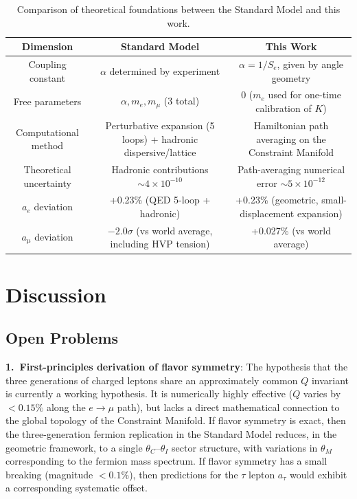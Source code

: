 \documentclass[aps,prd,reprint,nofootinbib]{revtex4-2}
\begin{document}
\begin{table}[h]
\caption{Comparison of theoretical foundations between the Standard Model and this work.}
\label{tab:comparison}
\begin{ruledtabular}
\begin{tabular}{c c c}
\hline
Dimension & Standard Model & This Work \\
\hline
Coupling constant & $\alpha$ determined by experiment & $\alpha = 1/S_e$, given by angle geometry \\
Free parameters & $\alpha, m_e, m_\mu$ (3 total) & 0 ($m_e$ used for one-time calibration of $K$) \\
Computational method & Perturbative expansion (5 loops) + hadronic dispersive/lattice & Hamiltonian path averaging on the Constraint Manifold \\
Theoretical uncertainty & Hadronic contributions $\sim 4 \times 10^{-10}$ & Path-averaging numerical error $\sim 5 \times 10^{-12}$ \\
$a_e$ deviation & +0.23\% (QED 5-loop + hadronic) & +0.23\% (geometric, small-displacement expansion) \\
$a_\mu$ deviation & $-2.0\sigma$ (vs world average, including HVP tension) & +0.027\% (vs world average) \\
\hline
\end{tabular}
\end{ruledtabular}
\end{table}

\section{Discussion}
\label{sec:discussion}

\subsection{Open Problems}

\textbf{1.\ First-principles derivation of flavor symmetry}: The hypothesis that the three generations of charged leptons share an approximately common $Q$ invariant is currently a working hypothesis. It is numerically highly effective ($Q$ varies by $< 0.15\%$ along the $e \to \mu$ path), but lacks a direct mathematical connection to the global topology of the Constraint Manifold. If flavor symmetry is exact, then the three-generation fermion replication in the Standard Model reduces, in the geometric framework, to a single $\theta_C$--$\theta_I$ sector structure, with variations in $\theta_M$ corresponding to the fermion mass spectrum. If flavor symmetry has a small breaking (magnitude $< 0.1\%$), then predictions for the $\tau$ lepton $a_\tau$ would exhibit a corresponding systematic offset.
\end{document}
